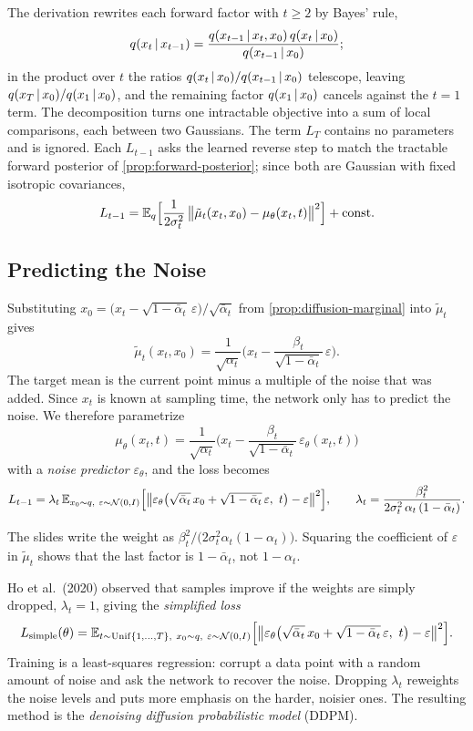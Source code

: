 The derivation rewrites each forward factor with $t\ge2$ by Bayes' rule,
\[
q(x_t\,|\, x_{t-1})=\frac{q(x_{t-1}\,|\, x_t,x_0)\,q(x_t\,|\, x_0)}{q(x_{t-1}\,|\, x_0)};
\]
in the product over $t$ the ratios $q(x_t\,|\, x_0)/q(x_{t-1}\,|\, x_0)$ telescope, leaving $q(x_T\,|\, x_0)/q(x_1\,|\, x_0)$, and the remaining factor $q(x_1\,|\, x_0)$ cancels against the $t=1$ term. The decomposition turns one intractable objective into a sum of local comparisons, each between two Gaussians. The term $L_T$ contains no parameters and is ignored. Each $L_{t-1}$ asks the learned reverse step to match the tractable forward posterior of \cref{prop:forward-posterior}; since both are Gaussian with fixed isotropic covariances,
\[
L_{t-1}=\mathbb{E}_q\Big[\frac{1}{2\sigma_t^2}\,\big\|\tilde\mu_t(x_t,x_0)-\mu_\theta(x_t,t)\big\|^2\Big]+\text{const}.
\]

\subsection{Predicting the Noise}

Substituting $x_0=\big(x_t-\sqrt{1-\bar\alpha_t}\,\varepsilon\big)/\sqrt{\bar\alpha_t}$ from \cref{prop:diffusion-marginal} into $\tilde\mu_t$ gives
\[
\tilde\mu_t(x_t,x_0)=\frac{1}{\sqrt{\alpha_t}}\Big(x_t-\frac{\beta_t}{\sqrt{1-\bar\alpha_t}}\,\varepsilon\Big).
\]
The target mean is the current point minus a multiple of the noise that was added. Since $x_t$ is known at sampling time, the network only has to predict the noise. We therefore parametrize
\begin{equation}\label{eq:eps-param}
\mu_\theta(x_t,t)=\frac{1}{\sqrt{\alpha_t}}\Big(x_t-\frac{\beta_t}{\sqrt{1-\bar\alpha_t}}\,\varepsilon_\theta(x_t,t)\Big)
\end{equation}
with a \emph{noise predictor} $\varepsilon_\theta$, and the loss becomes
\[
L_{t-1}=\lambda_t\,\E_{x_0\sim q,\ \varepsilon\sim\cN(0,I)}\Big[\big\|\varepsilon_\theta\big(\sqrt{\bar\alpha_t}\,x_0+\sqrt{1-\bar\alpha_t}\,\varepsilon,\ t\big)-\varepsilon\big\|^2\Big],\qquad \lambda_t=\frac{\beta_t^2}{2\sigma_t^2\,\alpha_t\,(1-\bar\alpha_t)}.
\]

\begin{remark}
The slides write the weight as $\beta_t^2/\big(2\sigma_t^2\alpha_t(1-\alpha_t)\big)$. Squaring the coefficient of $\varepsilon$ in $\tilde\mu_t$ shows that the last factor is $1-\bar\alpha_t$, not $1-\alpha_t$.
\end{remark}

Ho et al.\ (2020) observed that samples improve if the weights are simply dropped, $\lambda_t=1$, giving the \emph{simplified loss}
\[
L_{\mathrm{simple}}(\theta)=\E_{t\sim\mathrm{Unif}\{1,\dots,T\},\ x_0\sim q,\ \varepsilon\sim\cN(0,I)}\Big[\big\|\varepsilon_\theta\big(\sqrt{\bar\alpha_t}\,x_0+\sqrt{1-\bar\alpha_t}\,\varepsilon,\ t\big)-\varepsilon\big\|^2\Big].
\]
Training is a least-squares regression: corrupt a data point with a random amount of noise and ask the network to recover the noise. Dropping $\lambda_t$ reweights the noise levels and puts more emphasis on the harder, noisier ones. The resulting method is the \emph{denoising diffusion probabilistic model} (DDPM).

